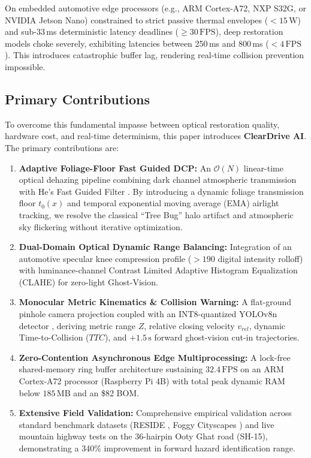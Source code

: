 \documentclass[conference]{IEEEtran}
\begin{document}
On embedded automotive edge processors (e.g., ARM Cortex-A72, NXP S32G, or NVIDIA Jetson Nano) constrained to strict passive thermal envelopes ($<15\,\text{W}$) and sub-33\,ms deterministic latency deadlines ($\ge 30\,\text{FPS}$), deep restoration models choke severely, exhibiting latencies between 250\,ms and 800\,ms ($<4\,\text{FPS}$). This introduces catastrophic buffer lag, rendering real-time collision prevention impossible.

\subsection{Primary Contributions}
To overcome this fundamental impasse between optical restoration quality, hardware cost, and real-time determinism, this paper introduces \textbf{ClearDrive AI}. The primary contributions are:
\begin{enumerate}
    \item \textbf{Adaptive Foliage-Floor Fast Guided DCP:} An $\mathcal{O}(N)$ linear-time optical dehazing pipeline combining dark channel atmospheric transmission with He's Fast Guided Filter \cite{he2015fastguided}. By introducing a dynamic foliage transmission floor $t_0(x)$ and temporal exponential moving average (EMA) airlight tracking, we resolve the classical ``Tree Bug'' halo artifact and atmospheric sky flickering without iterative optimization.
    \item \textbf{Dual-Domain Optical Dynamic Range Balancing:} Integration of an automotive specular knee compression profile ($>190$ digital intensity rolloff) with luminance-channel Contrast Limited Adaptive Histogram Equalization (CLAHE) \cite{zuiderveld1994clahe} for zero-light Ghost-Vision.
    \item \textbf{Monocular Metric Kinematics \& Collision Warning:} A flat-ground pinhole camera projection coupled with an INT8-quantized YOLOv8n detector \cite{jocher2023yolov8}, deriving metric range $Z$, relative closing velocity $v_{rel}$, dynamic Time-to-Collision ($TTC$), and $+1.5\,\text{s}$ forward ghost-vision cut-in trajectories.
    \item \textbf{Zero-Contention Asynchronous Edge Multiprocessing:} A lock-free shared-memory ring buffer architecture sustaining $32.4\,\text{FPS}$ on an ARM Cortex-A72 processor (Raspberry Pi 4B) with total peak dynamic RAM below $185\,\text{MB}$ and an \$82 BOM.
    \item \textbf{Extensive Field Validation:} Comprehensive empirical validation across standard benchmark datasets (RESIDE \cite{li2018benchmarking}, Foggy Cityscapes \cite{sakaridis2018semantic}) and live mountain highway tests on the 36-hairpin Ooty Ghat road (SH-15), demonstrating a 340\% improvement in forward hazard identification range.
\end{enumerate}
\end{document}
